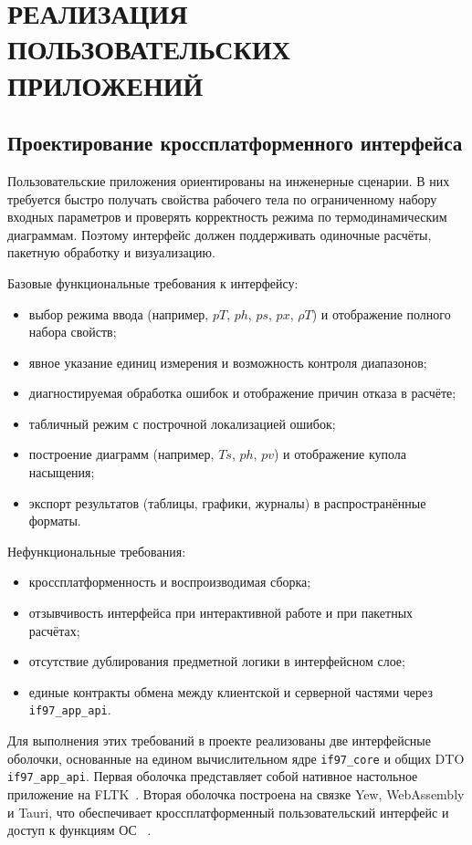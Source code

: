 \chapter{РЕАЛИЗАЦИЯ ПОЛЬЗОВАТЕЛЬСКИХ ПРИЛОЖЕНИЙ}

\section{Проектирование кроссплатформенного интерфейса}

Пользовательские приложения ориентированы на инженерные сценарии.
В них требуется быстро получать свойства рабочего тела
по ограниченному набору входных параметров
и проверять корректность режима по термодинамическим диаграммам.
Поэтому интерфейс должен поддерживать
одиночные расчёты, пакетную обработку и визуализацию.

Базовые функциональные требования к интерфейсу:
\begin{itemize}
\item выбор режима ввода (например, $pT$, $ph$, $ps$, $px$, $\rho T$) и отображение полного набора свойств;  
\item явное указание единиц измерения и возможность контроля диапазонов;  
\item диагностируемая обработка ошибок и отображение причин отказа в расчёте;  
\item табличный режим с построчной локализацией ошибок;  
\item построение диаграмм (например, $T$\textendash$s$, $p$\textendash$h$, $p$\textendash$v$) и отображение купола насыщения;  
\item экспорт результатов (таблицы, графики, журналы) в распространённые форматы.  
\end{itemize}

Нефункциональные требования:
\begin{itemize}
\item кроссплатформенность и воспроизводимая сборка;  
\item отзывчивость интерфейса при интерактивной работе и при пакетных расчётах;  
\item отсутствие дублирования предметной логики в интерфейсном слое;  
\item единые контракты обмена между клиентской и серверной частями через \texttt{if97\_app\_api}.  
\end{itemize}

	Для выполнения этих требований в проекте реализованы две интерфейсные оболочки,
	основанные на едином вычислительном ядре \texttt{if97\_core} и общих DTO \texttt{if97\_app\_api}.  
	Первая оболочка представляет собой нативное настольное приложение на FLTK~\cite{fltk_rs_docs}.  
	Вторая оболочка построена на связке Yew, WebAssembly и Tauri,
	что обеспечивает кроссплатформенный пользовательский интерфейс и доступ к функциям ОС
	~\cite{yew_docs,webassembly_docs,tauri_docs}.  

